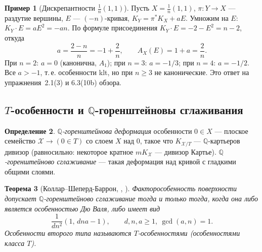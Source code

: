 \documentclass[11pt,a4paper]{article}
\theoremstyle{plain}
\newtheorem{theorem}{Теорема}[section]
\theoremstyle{definition}
\newtheorem{definition}[theorem]{Определение}
\newtheorem{example}[theorem]{Пример}
\theoremstyle{remark}
\newcommand{\Q}{\mathbb{Q}}
\newcommand{\cX}{\mathcal{X}}
\begin{document}
\begin{example}[Дискрепантности $\frac1n(1,1)$]\label{ex:discrep-P11n}
Пусть $X=\frac1n(1,1)$, $\pi\colon Y\to X$ --- раздутие вершины, $E$ --- $(-n)$-кривая,
$K_Y=\pi^*K_X+aE$. Умножим на $E$: $K_Y\cdot E=aE^2=-an$. По формуле присоединения
$K_Y\cdot E=-2-E^2=n-2$, откуда
\[
a=\frac{2-n}n=-1+\frac2n,\qquad A_X(E)=1+a=\frac2n .
\]
При $n=2$: $a=0$ (канонична, $A_1$); при $n=3$: $a=-1/3$; при $n=4$: $a=-1/2$. Все $a>-1$,
т.\,е. особенности klt, но при $n\ge3$ не канонические. Это ответ на упражнения~2.1(3) и
6.3(10b) обзора.
\end{example}

\subsection{$T$-особенности и $\Q$-горенштейновы сглаживания}\label{ss:T-sing}

\begin{definition}\label{def:QGor-smoothing}
\emph{$\Q$-горенштейнова деформация} особенности $0\in X$ --- плоское семейство $\cX\to(0\in T)$
со слоем $X$ над $0$, такое что $K_{\cX/T}$ --- $\Q$-картьеров дивизор (равносильно: некоторое
кратное $mK_\cX$ --- дивизор Картье). \emph{$\Q$-горенштейново сглаживание} --- такая деформация
над кривой с гладкими общими слоями.
\end{definition}

\begin{theorem}[{Коллар--Шеперд-Баррон, \cite[3.10]{KSB}, \cite[\S\,2]{HP}}]\label{thm:KSB}
Факторособенность поверхности допускает $\Q$-горенштейново сглаживание тогда и только тогда, когда
она либо является особенностью Дю Валя, либо имеет вид
\[
\frac1{dn^2}(1,\,dna-1),\qquad d,n,a\ge1,\ \gcd(a,n)=1 .
\]
Особенности второго типа называются \emph{$T$-особенностями} (\emph{особенностями класса $T$}).
\end{theorem}
\end{document}
